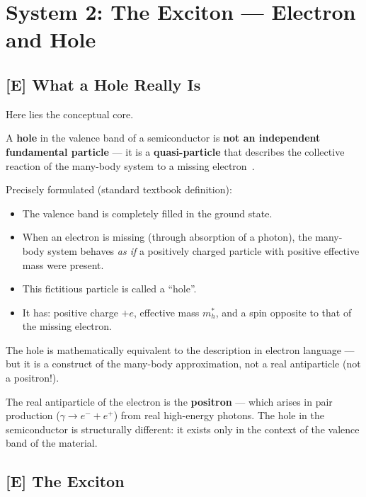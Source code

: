 \section{System 2: The Exciton --- Electron and Hole}
\label{sec:exciton}

\subsection{[E] What a Hole Really Is}

Here lies the conceptual core.

\begin{important}
A \textbf{hole} in the valence band of a semiconductor is
\textbf{not an independent fundamental particle} ---
it is a \textbf{quasi-particle} that describes the collective
reaction of the many-body system to a missing electron~\cite{Kittel2004,AshcroftMermin1976}.

Precisely formulated (standard textbook definition):
\begin{itemize}
  \item The valence band is completely filled in the ground state.
  \item When an electron is missing (through absorption of a photon),
    the many-body system behaves \emph{as if}
    a positively charged particle with positive effective mass
    were present.
  \item This fictitious particle is called a ``hole''.
  \item It has: positive charge $+e$, effective mass $m_h^*$,
    and a spin opposite to that of the missing electron.
\end{itemize}

The hole is mathematically equivalent to the description
in electron language --- but it is a construct of the
many-body approximation, not a real antiparticle
(not a positron!).
\end{important}

The real antiparticle of the electron is the \textbf{positron} ---
which arises in pair production ($\gamma \to e^- + e^+$)
from real high-energy photons. The hole in the semiconductor
is structurally different: it exists only in the context
of the valence band of the material.

\subsection{[E] The Exciton}

